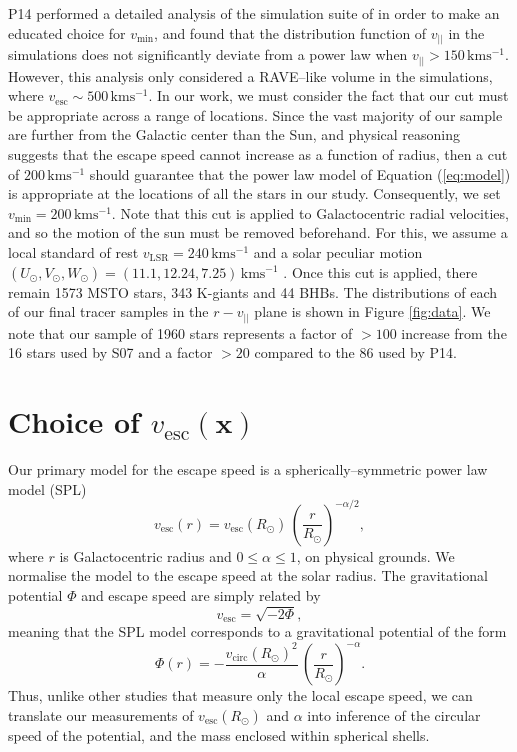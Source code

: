 \documentclass[useAMS,twocolumn,usenatbib]{mn2e}
\def\kms{{\,\mathrm{kms^{-1}}}}
\def\vlos{{v_{||}}}
\def\vesc{{v_\mathrm{esc}}}
\def\pos{{\boldsymbol{x}}}
\begin{document}
P14 performed a detailed analysis of the simulation suite of \citet{Sc09} 
in order to make an educated choice for $v_\mathrm{min}$, and found that the 
distribution function of $\vlos$ in the simulations does not significantly deviate 
from a power law when $\vlos>150\kms$. However, this analysis 
only considered a RAVE--like volume in the simulations, where $\vesc\sim500\kms$. In our 
work, we must consider the fact that our cut must be appropriate across a range of locations. 
Since the vast majority of our sample are further from the Galactic center than the 
Sun, and physical reasoning suggests that the escape speed cannot increase as a function of 
radius, then a cut of $200\kms$ should guarantee that the power law model of Equation (\ref{eq:model}) 
is appropriate at the locations of all the stars in our study. Consequently, we set $v_\mathrm{min}=200\kms$. 
Note that this cut is applied to Galactocentric radial velocities, and so the motion of the 
sun must be removed beforehand. For this, we assume a local standard of rest $v_\mathrm{LSR} = 240\kms$ and 
a solar peculiar motion $\left(U_\odot,V_\odot,W_\odot\right) = \left(11.1,12.24,7.25\right)\kms$ \citep{Sc10}.
Once this cut is applied, there remain 1573 MSTO stars, 343 K-giants and 44 BHBs. The distributions
of each of our final tracer samples in the $r-\vlos$ plane is shown in Figure \ref{fig:data}. We note 
that our sample of 1960 stars represents a factor of $>100$ increase from the 16 stars used by S07 
and a factor $>20$ compared to the 86 used by P14. 

\section{Choice of $\vesc(\pos)$}

Our primary model for the escape speed is a spherically--symmetric power law model (SPL) 
%
\begin{equation}
\vesc(r) = \vesc(R_\odot)\,\left(\dfrac{r}{R_\odot}\right)^{-\alpha/2},
\end{equation}
%
where $r$ is Galactocentric radius and $0 \leq \alpha \leq 1$, on physical grounds. 
We normalise the model to the escape speed at the solar radius. The gravitational 
potential $\Phi$ and escape speed are simply related by
%
\begin{equation}
\vesc = \sqrt{-2\Phi},
\end{equation}
%
meaning that the SPL model corresponds to a gravitational potential of 
the form 
%
\begin{equation}
\Phi(r) = -\dfrac{v_\mathrm{circ}(R_\odot)^2}{\alpha}\,\left(\dfrac{r}{R_\odot}\right)^{-\alpha}.
\label{eq:splgrav}
\end{equation}
%
Thus, unlike other studies that measure only the local escape speed, we can translate our 
measurements of $\vesc(R_\odot)$ and $\alpha$ into inference of the circular 
speed of the potential, and the mass enclosed within spherical shells.
\end{document}
